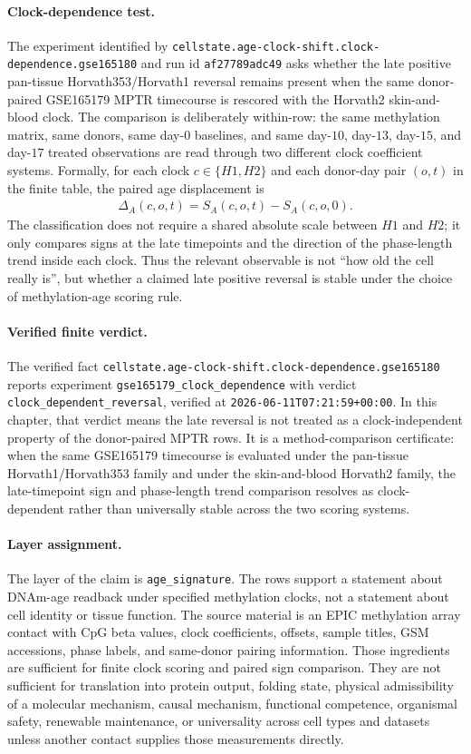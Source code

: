 \paragraph{Clock-dependence test.}
The experiment identified by \texttt{cellstate.age-clock-shift.clock-dependence.gse165180} and run id \texttt{af27789adc49} asks whether the late positive pan-tissue Horvath353/Horvath1 reversal remains present when the same donor-paired GSE165179 MPTR timecourse is rescored with the Horvath2 skin-and-blood clock.  The comparison is deliberately within-row: the same methylation matrix, same donors, same day-$0$ baselines, and same day-$10$, day-$13$, day-$15$, and day-$17$ treated observations are read through two different clock coefficient systems.  Formally, for each clock $c\in\{H1,H2\}$ and each donor-day pair $(o,t)$ in the finite table, the paired age displacement is
$$
\begin{aligned}
\Delta_A(c,o,t)=S_A(c,o,t)-S_A(c,o,0).
\end{aligned}
$$
The classification does not require a shared absolute scale between $H1$ and $H2$; it only compares signs at the late timepoints and the direction of the phase-length trend inside each clock.  Thus the relevant observable is not ``how old the cell really is'', but whether a claimed late positive reversal is stable under the choice of methylation-age scoring rule.

\paragraph{Verified finite verdict.}
The verified fact \texttt{cellstate.age-clock-shift.clock-dependence.gse165180} reports experiment \texttt{gse165179\_clock\_dependence} with verdict \texttt{clock\_dependent\_reversal}, verified at \texttt{2026-06-11T07:21:59+00:00}.  In this chapter, that verdict means the late reversal is not treated as a clock-independent property of the donor-paired MPTR rows.  It is a method-comparison certificate: when the same GSE165179 timecourse is evaluated under the pan-tissue Horvath1/Horvath353 family and under the skin-and-blood Horvath2 family, the late-timepoint sign and phase-length trend comparison resolves as clock-dependent rather than universally stable across the two scoring systems.

\paragraph{Layer assignment.}
The layer of the claim is \texttt{age\_signature}.  The rows support a statement about DNAm-age readback under specified methylation clocks, not a statement about cell identity or tissue function.  The source material is an EPIC methylation array contact with CpG beta values, clock coefficients, offsets, sample titles, GSM accessions, phase labels, and same-donor pairing information.  Those ingredients are sufficient for finite clock scoring and paired sign comparison.  They are not sufficient for translation into protein output, folding state, physical admissibility of a molecular mechanism, causal mechanism, functional competence, organismal safety, renewable maintenance, or universality across cell types and datasets unless another contact supplies those measurements directly.

